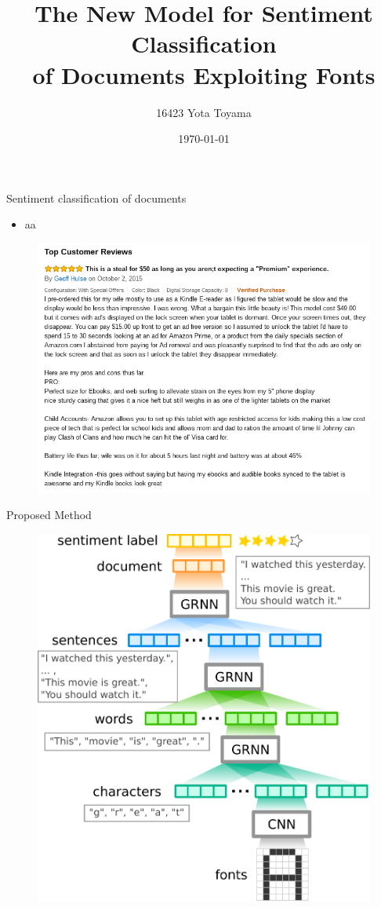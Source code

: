 \documentclass[aspectratio=43,unicode,10pt]{beamer}
\title[font2char2word2sent2doc]{
  The New Model for Sentiment Classification \\
  of Documents Exploiting Fonts}
\institute[CoIn Lab., TTI]{Computational Intelligence Laboratory, \\
                      Toyota Technological Institute}
\author{16423 Yota Toyama}
\date{\today}
\begin{document}
\begin{frame}
\titlepage
\end{frame}

\begin{frame}{Sentiment classification of documents}
  \begin{itemize}
    \item aa
  \end{itemize}
  \begin{figure}
    \includegraphics[width=0.7\linewidth]{fig/review.png}
  \end{figure}
\end{frame}

\begin{frame}{Proposed Method}
  \begin{figure}
    \includegraphics[width=0.6\linewidth]{fig/fcwsd.pdf}
  \end{figure}
\end{frame}
\end{document}
